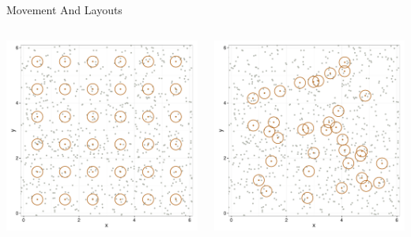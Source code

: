 \documentclass{beamer}
\begin{document}
\begin{frame}{Movement And Layouts}
	
	\begin{columns}
		\begin{column}{0.3\textwidth}
			\includegraphics[width=\textwidth]{../images/slides-layoutS.pdf}
		\end{column}
		\begin{column}{0.3\textwidth}
			\includegraphics[width=\textwidth]{../images/slides-layoutR.pdf}

\end{column}
\end{columns}
\end{frame}
\end{document}
